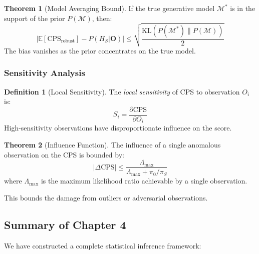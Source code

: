 \documentclass[12pt,a4paper]{article}
\theoremstyle{definition}
\newtheorem{definition}{Definition}[section]
\newtheorem{theorem}{Theorem}[section]
\theoremstyle{remark}
\begin{document}
\begin{theorem}[Model Averaging Bound]
\label{thm:model-avg}
If the true generative model $\mathcal{M}^*$ is in the support of the prior $P(\mathcal{M})$, then:
\begin{equation}
    \left| \mathbb{E}[\text{CPS}_{\text{robust}}] - P(H_S | \mathbf{O}) \right| \leq \sqrt{\frac{\text{KL}(P(\mathcal{M}^*) \| P(\mathcal{M}))}{2}}
\end{equation}
The bias vanishes as the prior concentrates on the true model.
\end{theorem}

\subsubsection{Sensitivity Analysis}

\begin{definition}[Local Sensitivity]
The \emph{local sensitivity} of CPS to observation $O_i$ is:
\begin{equation}
    S_i = \frac{\partial \text{CPS}}{\partial O_i}
\end{equation}
High-sensitivity observations have disproportionate influence on the score.
\end{definition}

\begin{theorem}[Influence Function]
\label{thm:influence}
The influence of a single anomalous observation on the CPS is bounded by:
\begin{equation}
    |\Delta \text{CPS}| \leq \frac{\Lambda_{\max}}{\Lambda_{\max} + \pi_0/\pi_S}
\end{equation}
where $\Lambda_{\max}$ is the maximum likelihood ratio achievable by a single observation.
\end{theorem}

This bounds the damage from outliers or adversarial observations.

\subsection{Summary of Chapter 4}

We have constructed a complete statistical inference framework:
\end{document}
